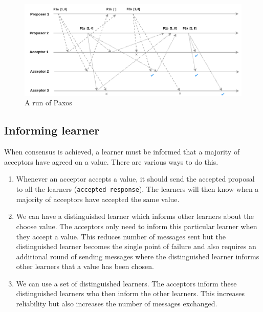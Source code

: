 \begin{figure}
\centering
\includegraphics[width=\textwidth]{figures/paxos_run.png}
\caption{A run of Paxos
\label{fig:myInlineFigure}}
\end{figure}

\vspace{-4mm}
\subsection{Informing learner}
When consensus is achieved, a learner must be informed that a majority of acceptors
have agreed on a value. There are various ways to do this.

\begin{enumerate}
  \item Whenever an acceptor accepts a value, it should send the accepted proposal
    to all the learners (\texttt{accepted response}).
    The learners will then know when a majority of acceptors
    have accepted the same value.
  \item We can have a distinguished learner which informs other learners about
    the choose value. The acceptors only need to inform this particular learner
    when they accept a value. This reduces number of messages sent but the
    distinguished learner becomes the single point of failure and also requires
    an additional round of sending messages where the distinguished learner informs
    other learners that a value has been chosen.
  \item We can use a set of distinguished learners. The acceptors inform these
    distinguished learners who then inform the other learners. This increases
    reliability but also increases the number of messages exchanged.
\end{enumerate}

\vspace{-5mm}
